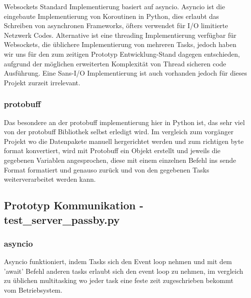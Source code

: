 Websockets Standard Implementierung basiert auf asyncio.
%  
Asyncio ist die eingebaute Implementierung von Koroutinen in Python,
dies erlaubt das Schreiben von asynchronen Frameworks, 
öfters verwendet für I/O limitierte Netzwerk Codes.
Alternative ist eine threading Implementierung verfügbar für Websockets, 
die üblichere Implementierung von mehreren Tasks, 
jedoch haben wir uns für den zum zeitigen Prototyp Entwicklung-Stand dagegen entschieden,
aufgrund der möglichen erweiterten Komplexität von Thread sicheren code Ausführung.
Eine Sans-I/O Implementierung ist auch vorhanden jedoch für dieses Projekt zurzeit irrelevant.

\subsubsection{protobuff}
Das besondere an der protobuff implementierung hier in Python ist,
das sehr viel von der protobuff Bibliothek selbst erledigt wird.
Im vergleich zum vorgänger Projekt wo die Datenpakete manuell hergerichtet werden
und zum richtigen byte format konvertiert, wird mit Protobuff ein Objekt erstellt 
und jeweils die gegebenen Variablen angesprochen, 
diese mit einem einzelnen Befehl ins sende Format formatiert und genauso zurück
und von den gegebenen Tasks weiterverarbeitet werden kann.


\subsection{Prototyp Kommunikation - test\_server\_passby.py}



\subsubsection{asyncio}
Asyncio funktioniert, indem Tasks sich den Event loop nehmen und mit dem 'await' 
Befehl anderen tasks erlaubt sich den event loop zu nehmen, im vergleich zu üblichen multitasking
wo jeder task eine feste zeit zugeschrieben bekommt vom Betriebsystem.

